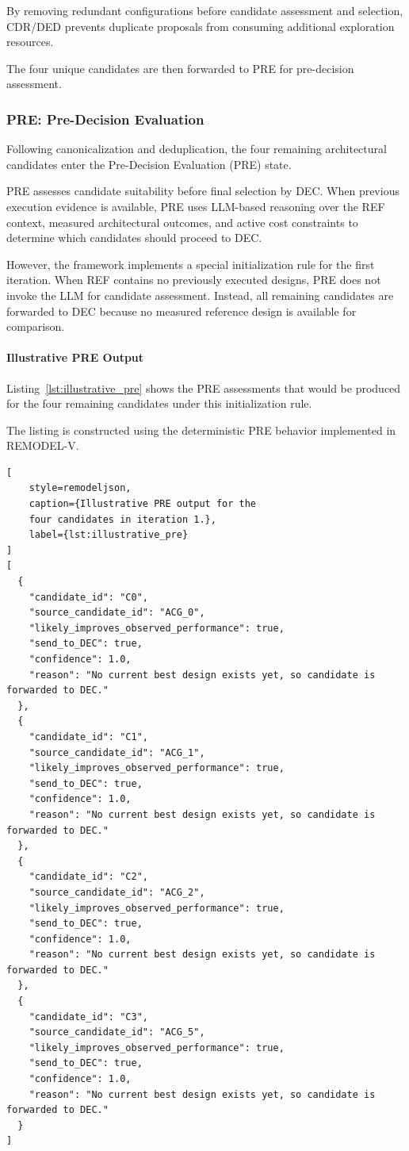 By removing redundant configurations
before candidate assessment and selection,
CDR/DED prevents duplicate proposals
from consuming additional exploration
resources.

The four unique candidates are then
forwarded to PRE for pre-decision assessment.


\subsubsection{PRE: Pre-Decision Evaluation}
\label{app:illustrative_pre}

Following canonicalization and deduplication,
the four remaining architectural candidates
enter the Pre-Decision Evaluation (PRE) state.

PRE assesses candidate suitability before
final selection by DEC. When previous execution
evidence is available, PRE uses LLM-based
reasoning over the REF context, measured
architectural outcomes, and active cost
constraints to determine which candidates
should proceed to DEC.

However, the framework implements a special
initialization rule for the first iteration.
When REF contains no previously executed
designs, PRE does not invoke the LLM for
candidate assessment. Instead, all remaining
candidates are forwarded to DEC because
no measured reference design is available
for comparison.

\paragraph{Illustrative PRE Output}

Listing~\ref{lst:illustrative_pre}
shows the PRE assessments that would be
produced for the four remaining candidates
under this initialization rule.

The listing is constructed using the
deterministic PRE behavior implemented
in REMODEL-V.

\begin{lstlisting}[
    style=remodeljson,
    caption={Illustrative PRE output for the
    four candidates in iteration 1.},
    label={lst:illustrative_pre}
]
[
  {
    "candidate_id": "C0",
    "source_candidate_id": "ACG_0",
    "likely_improves_observed_performance": true,
    "send_to_DEC": true,
    "confidence": 1.0,
    "reason": "No current best design exists yet, so candidate is forwarded to DEC."
  },
  {
    "candidate_id": "C1",
    "source_candidate_id": "ACG_1",
    "likely_improves_observed_performance": true,
    "send_to_DEC": true,
    "confidence": 1.0,
    "reason": "No current best design exists yet, so candidate is forwarded to DEC."
  },
  {
    "candidate_id": "C2",
    "source_candidate_id": "ACG_2",
    "likely_improves_observed_performance": true,
    "send_to_DEC": true,
    "confidence": 1.0,
    "reason": "No current best design exists yet, so candidate is forwarded to DEC."
  },
  {
    "candidate_id": "C3",
    "source_candidate_id": "ACG_5",
    "likely_improves_observed_performance": true,
    "send_to_DEC": true,
    "confidence": 1.0,
    "reason": "No current best design exists yet, so candidate is forwarded to DEC."
  }
]
\end{lstlisting}

